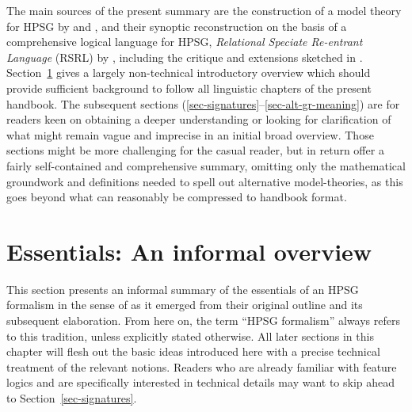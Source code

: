 \documentclass[output=paper
 	        ,biblatex
                ,babelshorthands
                ,newtxmath
                ,draftmode
                ,colorlinks, citecolor=brown
]{langscibook}
\begin{document}

The main sources of the present summary are the construction of a
model theory for HPSG by \citet{King99a-u} and \citet{Pollard99a}, and
their synoptic reconstruction on the basis of a comprehensive logical
language for HPSG, \emph{Relational Speciate Re-entrant Language}
(RSRL) by \citet{Richter2004a-u}, including the critique and
extensions sketched in
\citet{Richter2007a}. Section~\ref{sec-essentials} gives a largely
non-technical introductory overview which should provide sufficient
background to follow all linguistic chapters of the present
handbook. The subsequent sections
(\ref{sec-signatures}--\ref{sec-alt-gr-meaning}) are for readers
keen on obtaining a deeper understanding or looking for clarification
of what might
remain vague and imprecise in an initial broad overview. Those sections
might be more challenging for the casual reader, but in return offer a
fairly self-contained and comprehensive summary, omitting only
the mathematical groundwork and
definitions needed to spell out alternative
model-theories, as this goes beyond what can reasonably be compressed to
handbook format.


\section{Essentials: An informal overview}
\label{sec-essentials}


This section presents an informal summary of the essentials of an HPSG
formalism in the sense of \cite{PollardSag1994} as it emerged from their
original outline and its subsequent elaboration. From here on, the term
``HPSG formalism'' always refers to this tradition, unless explicitly
stated otherwise.  All later sections in this chapter will flesh out
the basic ideas introduced here with a precise technical treatment of
the relevant notions. Readers who are already familiar with feature
logics and are specifically interested in technical details may want
to skip ahead to Section~\ref{sec-signatures}.
\end{document}
